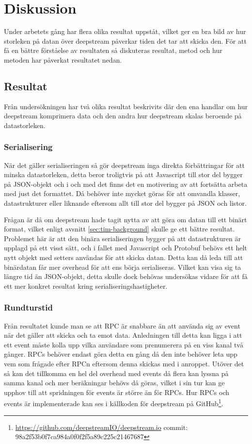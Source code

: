 \section{Diskussion}
\label{sec:tim-discussion}
Under arbetets gång har flera olika resultat uppståt, vilket ger en bra bild av hur storleken på datan över deepstream påverkar tiden det tar att skicka den. För att få en bättre förståelse av resultaten så diskuteras resultat, metod och hur metoden har påverkat resultatet nedan. 

\subsection{Resultat}
\label{subsec:tim-discussion-results}
Från undersökningen har två olika resultat beskrivits där den ena handlar om hur deepstream komprimera data och den andra hur deepstream skalas beroende på datastorleken.

\subsubsection{Serialisering}
När det gäller serialiseringen så gör deepstream inga direkta förbättringar för att minska datastorleken, detta beror troligtvis på att Javascript till stor del bygger på JSON-objekt och i och med det finns det en motivering av att fortsätta arbeta med just det formattet. Då behöver inte mycket göras för att omvandla klasser, datastrukturer eller liknande eftersom allt till stor del bygger på JSON och listor.

Frågan är då om deepstream hade tagit nytta av att göra om datan till ett binärt format, vilket enligt avsnitt \ref{sec:tim-background} skulle ge ett bättre resultat. Problemet här är att den binära serialiseringen bygger på att datastrukturen är upplagd på ett visst sätt, och i fallet med Javascript och Protobuf behövs ett helt nytt objekt med setters användas för att skicka datan. Detta kan då leda till att binärdatan får mer overhead för att ens börja serialiseras. Vilket kan visa sig ta längre tid än JSON-objekt, detta skulle dock behövas undersökas vidare för att få ett mer konkret resultat kring serialiseringshastigheter.

\subsubsection{Rundturstid}
Från resultatet kunde man se att RPC är snabbare än att använda sig av event när det gäller att skicka och ta emot data. Anledningen till detta kan ligga i att ett event måste kolla upp vilka användare som prenumerera på en viss kanal två gånger. RPCs behöver endast göra detta en gång då den inte behöver leta upp vem som frågade efter RPCn eftersom denna skickas med i anroppet. Utöver det så kan det tillkomma en hel del overhead med events då flera kan lyssna på samma kanal och mer beräkningar behövs då göras, vilket i sin tur kan ge upphov till att spridningen för events är större än för RPCs. Hur RPCs och events är implementerade kan ses i källkoden för deepstream på GitHub\footnote{\url{https://github.com/deepstreamIO/deepstream.io} \newline commit: 98a2f53b0f7ca984a0f0f2f5a89c225c21467687}. 

